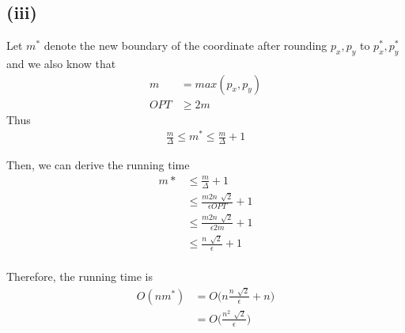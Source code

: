 \subsection*{(iii)}

Let $m^*$ denote the new boundary of the coordinate after rounding $p_{x}, p_{y}$ to $p^*_{x}, p^*_{y}$
and we also know that
\begin{align*}
			m &= max(p_x,p_y ) \\
			OPT &\geq 2m
\end{align*}
Thus
\begin{align*}
			\frac{m}{\Delta} \leq m^* \leq \frac{m}{\Delta} + 1
\end{align*}

Then, we can derive the running time
\begin{align*}
	m* &\leq \frac{m}{\Delta} + 1 \\
	&\leq \frac{m2n\,\sqrt[]{2}}{\epsilon OPT}+1 \\
	&\leq \frac{m2n\,\sqrt[]{2}}{\epsilon 2m}+1 \\
	&\leq \frac{n\,\sqrt[]{2}}{\epsilon}+1 \\
\end{align*}

Therefore, the running time is
\begin{align*}
	O\left(nm^*\right) &= O\Big(n\frac{n\,\sqrt[]{2}}{\epsilon}+n \Big) \\
	&= O\Big(\frac{n^2\,\sqrt[]{2}}{\epsilon} \Big)
\end{align*}
